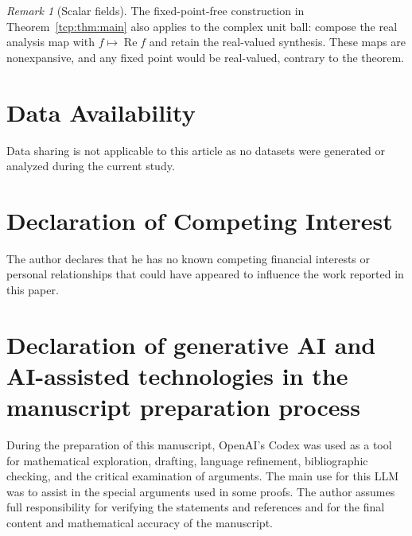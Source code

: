 \documentclass[preprint,12pt,nopreprintline]{elsarticle}
\theoremstyle{definition}
\theoremstyle{remark}
\newtheorem{remark}[theorem]{Remark}
\numberwithin{equation}{section}
\begin{document}
\begin{remark}[Scalar fields]
The fixed-point-free construction in Theorem~\ref{tcp:thm:main} also applies to the complex unit ball: compose the real analysis
map with $f\mapsto\operatorname{Re}f$ and retain the real-valued synthesis. These maps are nonexpansive, and any fixed point would
be real-valued, contrary to the theorem.
\end{remark}


\section*{Data Availability}
Data sharing is not applicable to this article as no datasets were generated or analyzed during the current study.

\section*{Declaration of Competing Interest}
The author declares that he has no known competing financial interests or personal relationships that could have appeared to influence the work reported in this paper.

\section*{Declaration of generative AI and AI-assisted technologies in the manuscript preparation process}

During the preparation of this manuscript, OpenAI's Codex was used as a tool for mathematical exploration, drafting, language refinement, bibliographic checking, and the critical examination of arguments. The main use for this LLM was to assist in the special arguments used in some proofs. The author assumes full responsibility for verifying the statements and references and for the final content and mathematical accuracy of the manuscript.
\end{document}
